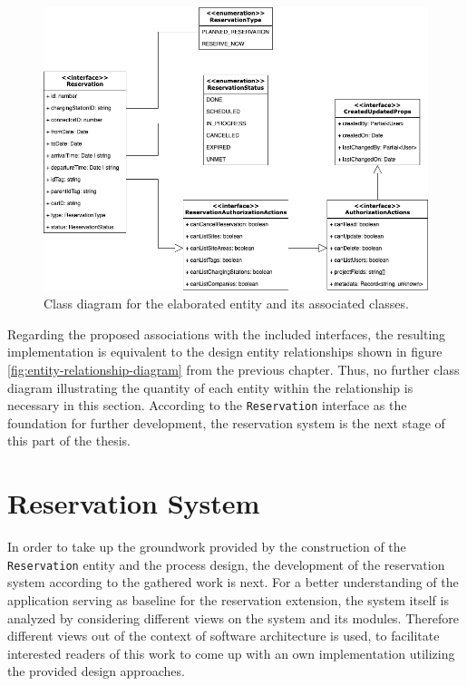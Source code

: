 \begin{figure}[h]
    \centering
    \includegraphics[scale=0.4]{resources/images/main/6_implementation/Reservation.png}
    \caption{Class diagram for the elaborated entity and its associated classes.}
    \label{fig:reservation-class-diagram}
\end{figure}

\noindent Regarding the proposed associations with the included interfaces, the resulting implementation is equivalent to the design entity relationships shown in figure \ref{fig:entity-relationship-diagram} from the previous chapter. Thus, no further class diagram illustrating the quantity of each entity within the relationship is necessary in this section.
According to the \texttt{Reservation} interface as the foundation for further development, the reservation system is the next stage of this part of the thesis. 

\section{Reservation System}
\label{ch:Implementation:sec:Reservation System}

In order to take up the groundwork provided by the construction of the \texttt{Reservation} entity and the process design, the development of the reservation system according to the gathered work is next.
For a better understanding of the application serving as baseline for the reservation extension, the system itself is analyzed by considering different views on the system and its modules.
Therefore different views out of the context of software architecture is used, to facilitate interested readers of this work to come up with an own implementation utilizing the provided design approaches.

